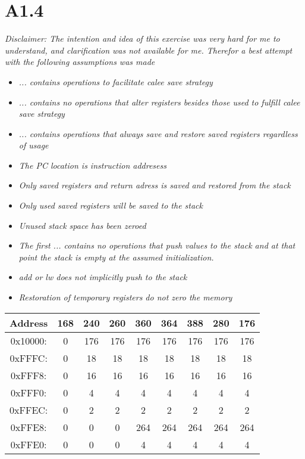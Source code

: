 \section*{A1.4}
\textit{Disclaimer: The intention and idea of this exercise was very hard for me to understand, and clarification was not available for me. Therefor a best attempt with the following assumptions was made}
\begin{itemize}
    \item \textit{... contains operations to facilitate calee save strategy}
    \item \textit{... contains no operations that alter registers besides those used to fulfill calee save strategy}
    \item \textit{... contains operations that always save and restore saved registers regardless of usage}
    \item \textit{The PC location is instruction addresess}
    \item \textit{Only saved registers and return adress is saved and restored from the stack}
    \item \textit{Only used saved registers will be saved to the stack}
    \item \textit{Unused stack space has been zeroed}
    \item \textit{The first ... contains no operations that push values to the stack and at that point the stack is empty at the assumed initialization.}
    \item \textit{add or lw does not implicitly push to the stack}
    \item \textit{Restoration of temporary registers do not zero the memory}
\end{itemize}


\begin{center}
    \begin{tabular}{c | c | c | c | c | c | c | c | c}
        \textbf{Address} & \textbf{168} & \textbf{240} & \textbf{260} & \textbf{360} & \textbf{364} & \textbf{388} & \textbf{280} & \textbf{176} \\
        \hline
        0x10000:    & 0 & 176 & 176 & 176 & 176 & 176 & 176 & 176  \\ 
        0xFFFC:     & 0 & 18 & 18 & 18 & 18 & 18 & 18 & 18    \\
        0xFFF8:     & 0 & 16 & 16 & 16 & 16 & 16 & 16 & 16    \\
        0xFFF0:     & 0 & 4 & 4 & 4 & 4 & 4 & 4 & 4    \\
        0xFFEC:     & 0 & 2 & 2 & 2 & 2 & 2 & 2 & 2    \\
        0xFFE8:     & 0 & 0 & 0 & 264 & 264 & 264 & 264 & 264    \\
        0xFFE0:     & 0 & 0 & 0 & 4 & 4 & 4 & 4 & 4    \\
    \end{tabular}
\end{center}

